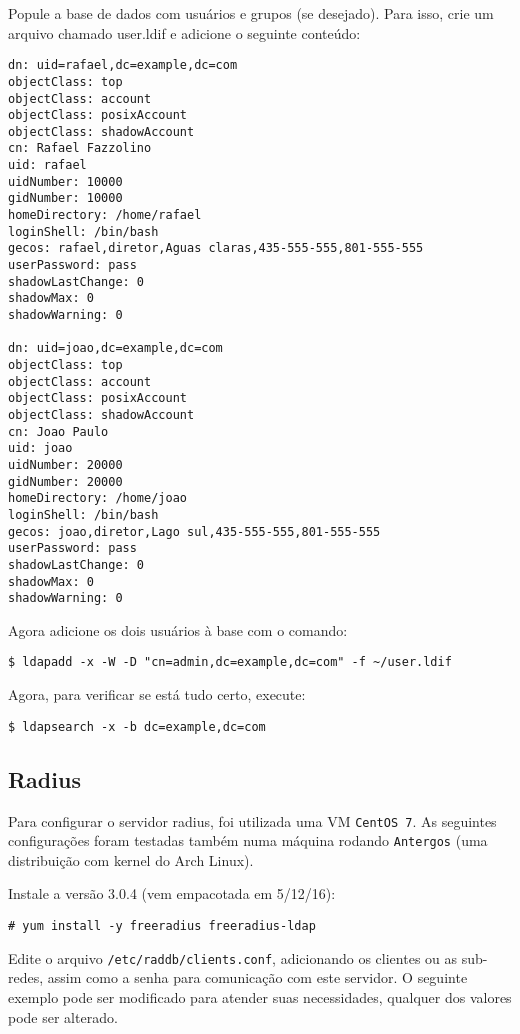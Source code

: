 Popule a base de dados com usuários e grupos (se desejado).
Para isso, crie um arquivo chamado user.ldif e adicione o seguinte conteúdo:

\begin{verbatim}
dn: uid=rafael,dc=example,dc=com
objectClass: top
objectClass: account
objectClass: posixAccount
objectClass: shadowAccount
cn: Rafael Fazzolino
uid: rafael
uidNumber: 10000
gidNumber: 10000
homeDirectory: /home/rafael
loginShell: /bin/bash
gecos: rafael,diretor,Aguas claras,435-555-555,801-555-555
userPassword: pass
shadowLastChange: 0
shadowMax: 0
shadowWarning: 0

dn: uid=joao,dc=example,dc=com
objectClass: top
objectClass: account
objectClass: posixAccount
objectClass: shadowAccount
cn: Joao Paulo
uid: joao
uidNumber: 20000
gidNumber: 20000
homeDirectory: /home/joao
loginShell: /bin/bash
gecos: joao,diretor,Lago sul,435-555-555,801-555-555
userPassword: pass
shadowLastChange: 0
shadowMax: 0
shadowWarning: 0
\end{verbatim}

Agora adicione os dois usuários à base com o comando:
\begin{verbatim}
$ ldapadd -x -W -D "cn=admin,dc=example,dc=com" -f ~/user.ldif
\end{verbatim}

Agora, para verificar se está tudo certo, execute:

\begin{verbatim}
$ ldapsearch -x -b dc=example,dc=com
\end{verbatim}


\subsection{Radius}
Para configurar o servidor radius, foi utilizada uma VM \verb|CentOS 7|. As seguintes
configurações foram testadas também numa máquina rodando \verb|Antergos| (uma distribuição
com kernel do Arch Linux). 

Instale a versão 3.0.4 (vem empacotada em 5/12/16):
\begin{verbatim}
# yum install -y freeradius freeradius-ldap
\end{verbatim}

Edite o arquivo \verb|/etc/raddb/clients.conf|, adicionando os clientes ou as sub-redes,
assim como a senha para comunicação com este servidor. O seguinte exemplo pode ser modificado
para atender suas necessidades, qualquer dos valores pode ser alterado.

